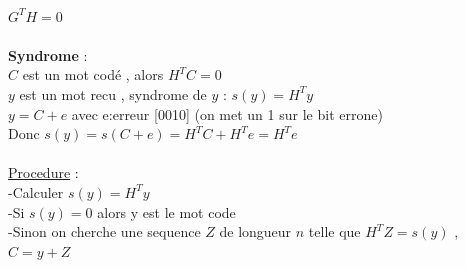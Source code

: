 \documentclass[a4paper,8pt,openany]{book}
\begin{document}
\\
$G^TH=0$\\
\\
\textbf{Syndrome} :\\
$C$ est un mot cod\'e , alors $H^TC=0$\\
$y$ est un mot recu , syndrome de $y$ : $s(y)=H^Ty$\\
$y=C+e$ avec e:erreur [0010] (on met un 1 sur le bit errone)\\ 
Donc $s(y)=s(C+e)=H^TC+H^Te=H^Te$\\
\\
\underline{Procedure} :\\
-Calculer $s(y)=H^Ty$ \\
-Si $s(y)=0$ alors y est le mot code\\
-Sinon on cherche une sequence $Z$ de longueur $n$ telle que $H^TZ=s(y)$ , $C=y+Z$\\
\end{document}
